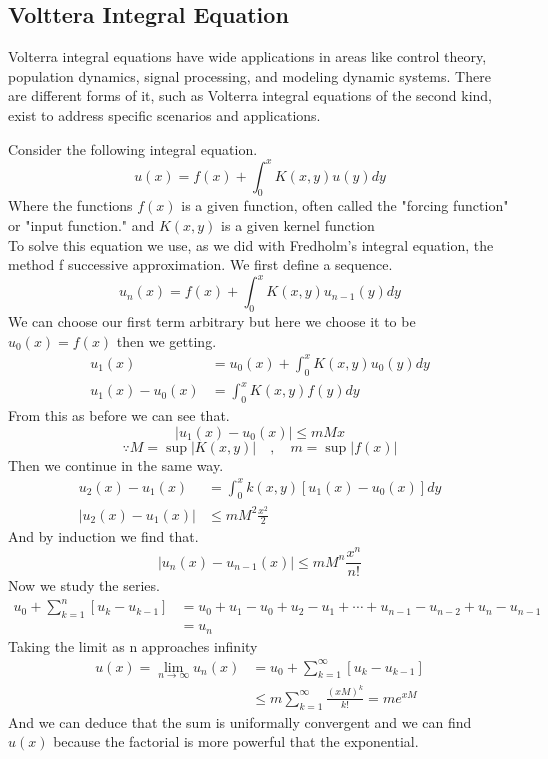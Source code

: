 \documentclass[]{article}
\begin{document}
\subsection{Volttera Integral Equation}
Volterra integral equations have wide applications in areas like control theory, 
population dynamics, signal processing, and modeling dynamic systems. 
There are different forms of it, such as Volterra integral equations of the second kind, exist to address specific scenarios and applications.
\par 
Consider the following  integral equation.
\[
u(x) = f(x) + \int_{0}^{x} K(x,y) u(y)dy
\]
Where the functions $f(x)$ is a given function, often called the "forcing function" or "input function."
and $K(x,y)$ is a given kernel function
\\
To solve this equation we use, as we did with Fredholm's integral equation, the method f successive approximation. We first define a sequence.
\[
u_n(x) = f(x) + \int_{0}^{x} K(x,y) u_{n-1}(y)dy    
\]
We can choose our first term arbitrary but here we choose it to be $u_0(x) = f(x)$ then we getting.
\begin{align*}
u_1(x) &= u_0(x) + \int_{0}^{x} K(x,y) u_0(y)dy
\\
u_1(x) - u_0(x) &= \int_{0}^{x} K(x,y) f(y)dy
\end{align*}
From this as before we can see that.
\[
|u_1(x) - u_0(x)| \leq mMx
\]
\[
\because M=\sup|K(x,y)| \quad , \quad m=\sup |f(x)|        
\]
Then we continue in the same way.
\begin{align*}
u_2(x) - u_1(x) &= \int_{0}^{x} k(x,y) [u_1(x) - u_0(x)] dy
\\
|u_2(x) - u_1(x)| &\leq mM^2\frac{x^2}{2}
\end{align*}
And by induction we find that.
\[
|u_n(x) - u_{n-1}(x)| \leq mM^n\frac{x^n}{n!}    
\]
Now we study the series.
\begin{align*}
u_0 + \sum_{k=1}^{n} [u_k-u_{k-1}] &= u_0 + u_1 - u_0 +u_2 - u_1 + \cdots +u_{n-1}-u_{n-2}+ u_n - u_{n-1} 
\\
&= u_n
\end{align*}
Taking the limit as n approaches infinity
\begin{align*}
u(x) = \lim_{n\to \infty} u_n(x) &= u_0 + \sum_{k=1}^{\infty} [u_k-u_{k-1}]    
\\
& \leq m\sum_{k=1}^{\infty} \frac{{(xM)}^k}{k!} = m e^{xM}
\end{align*}
And we can deduce that the sum is uniformally convergent and we can find $u(x)$ because the factorial is more powerful that the exponential.
\end{document}
